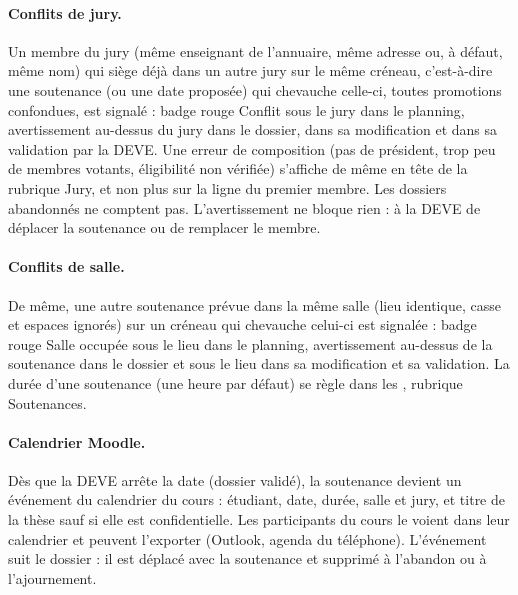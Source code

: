 \documentclass[11pt,a4paper]{article}
\begin{document}
\paragraph{Conflits de jury.} Un membre du jury (même enseignant de
l'annuaire, même adresse ou, à défaut, même nom) qui siège déjà dans un autre
jury sur le même créneau, c'est-à-dire une soutenance (ou une date proposée)
qui chevauche celle-ci, toutes promotions confondues, est signalé : badge
rouge \og Conflit\fg{} sous le jury dans le planning, avertissement au-dessus
du jury dans le dossier, dans sa modification et dans sa validation par la
DEVE. Une erreur de composition (pas de président, trop peu de membres
votants, éligibilité non vérifiée) s'affiche de même en tête de la rubrique
\og Jury\fg{}, et non plus sur la ligne du premier membre. Les dossiers
abandonnés ne comptent pas. L'avertissement ne bloque rien : à la DEVE de
déplacer la soutenance ou de remplacer le membre.

\paragraph{Conflits de salle.} De même, une autre soutenance prévue dans la
même salle (lieu identique, casse et espaces ignorés) sur un créneau qui
chevauche celui-ci est signalée : badge rouge \og Salle occupée\fg{} sous le
lieu dans le planning, avertissement au-dessus de la soutenance dans le
dossier et sous le lieu dans sa modification et sa validation. La durée d'une soutenance
(une heure par défaut) se règle dans les ,
rubrique \og Soutenances\fg{}.

\paragraph{Calendrier Moodle.} Dès que la DEVE arrête la date (dossier
validé), la soutenance devient un événement du calendrier du cours : étudiant,
date, durée, salle et jury, et titre de la thèse sauf si elle est
confidentielle. Les participants du cours le voient dans leur calendrier et
peuvent l'exporter (Outlook, agenda du téléphone). L'événement suit le dossier
: il est déplacé avec la soutenance et supprimé à l'abandon ou à
l'ajournement.


\end{document}
